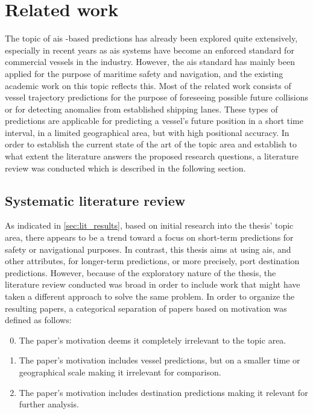 \chapter{Related work}
\label{chap:related_work}

The topic of \acrfull{ais} -based predictions has already been explored quite extensively, especially in recent years as \acrshort{ais} systems have become an enforced standard for commercial vessels in the industry. However, the \acrshort{ais} standard has mainly been applied for the purpose of maritime safety and navigation, and the existing academic work on this topic reflects this. Most of the related work consists of vessel trajectory predictions for the purpose of foreseeing possible future collisions or for detecting anomalies from established shipping lanes. These types of predictions are applicable for predicting a vessel's future position in a short time interval, in a limited geographical area, but with high positional accuracy. In order to establish the current state of the art of the topic area and establish to what extent the literature answers the proposed research questions, a literature review was conducted which is described in the following section.

\section{Systematic literature review}
\label{sec:lit_review}

As indicated in \cref{sec:lit_results}, based on initial research into the thesis' topic area, there appears to be a trend toward a focus on short-term predictions for safety or navigational purposes. In contrast, this thesis aims at using \acrshort{ais}, and other attributes, for longer-term predictions, or more precisely, port destination predictions. However, because of the exploratory nature of the thesis, the literature review conducted was broad in order to include work that might have taken a different approach to solve the same problem. In order to organize the resulting papers, a categorical separation of papers based on motivation was defined as follows:

\begin{enumerate}
\setcounter{enumi}{-1}
    \item The paper's motivation deems it completely irrelevant to the topic area.
    \item The paper's motivation includes vessel predictions, but on a smaller time or geographical scale making it irrelevant for comparison.
    \item The paper's motivation includes destination predictions making it relevant for further analysis.
\end{enumerate}

